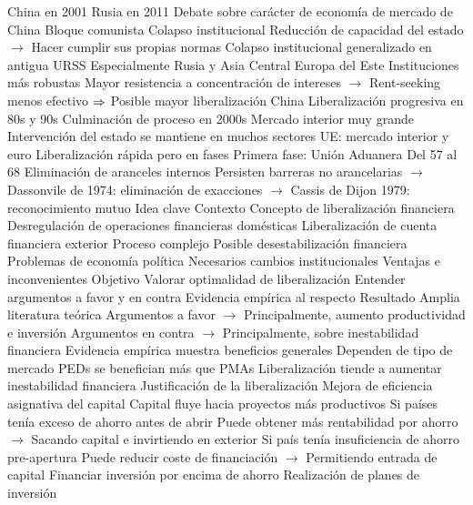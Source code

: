 \documentclass{nuevotema}
\begin{document}
\begin{esquemal}
				\4[] China en 2001
				\4[] Rusia en 2011
				\4[] Debate sobre carácter de economía de mercado de China
			\3 Bloque comunista
				\4 Colapso institucional
				\4[] Reducción de capacidad del estado
				\4[] $\to$ Hacer cumplir sus propias normas
				\4 Colapso institucional generalizado en antigua URSS
				\4[] Especialmente Rusia y Asia Central
				\4 Europa del Este
				\4[] Instituciones más robustas
				\4[] Mayor resistencia a concentración de intereses
				\4[] $\to$ Rent-seeking menos efectivo
				\4[] $\Rightarrow$ Posible mayor liberalización
			\3 China
				\4 Liberalización progresiva en 80s y 90s
				\4 Culminación de proceso en 2000s
				\4 Mercado interior muy grande
				\4 Intervención del estado se mantiene en muchos sectores
			\3 UE: mercado interior y euro
				\4 Liberalización rápida pero en fases
				\4 Primera fase: Unión Aduanera
				\4[] Del 57 al 68
				\4[] Eliminación de aranceles internos
				\4[] Persisten barreras no arancelarias
				\4[] $\to$ Dassonvile de 1974: eliminación de exacciones
				\4[] $\to$ Cassis de Dijon 1979: reconocimiento mutuo
	\1 
		\2 Idea clave
			\3 Contexto
				\4 Concepto de liberalización financiera
				\4[] Desregulación de operaciones financieras domésticas
				\4[] Liberalización de cuenta financiera exterior
				\4 Proceso complejo
				\4[] Posible desestabilización financiera
				\4[] Problemas de economía política
				\4[] Necesarios cambios institucionales
				\4 Ventajas e inconvenientes
			\3 Objetivo
				\4 Valorar optimalidad de liberalización
				\4 Entender argumentos a favor y en contra
				\4 Evidencia empírica al respecto
			\3 Resultado
				\4 Amplia literatura teórica
				\4[] Argumentos a favor
				\4[] $\to$ Principalmente, aumento productividad e inversión
				\4[] Argumentos en contra
				\4[] $\to$ Principalmente, sobre inestabilidad financiera
				\4 Evidencia empírica muestra beneficios generales
				\4 Dependen de tipo de mercado
				\4 PEDs se benefician más que PMAs
				\4 Liberalización tiende a aumentar inestabilidad financiera
		\2 Justificación de la liberalización
			\3 Mejora de eficiencia asignativa del capital
				\4 Capital fluye hacia proyectos más productivos
				\4 Si países tenía exceso de ahorro antes de abrir
				\4[] Puede obtener más rentabilidad por ahorro
				\4[] $\to$ Sacando capital e invirtiendo en exterior
				\4 Si país tenía insuficiencia de ahorro pre-apertura
				\4[] Puede reducir coste de financiación
				\4[] $\to$ Permitiendo entrada de capital
			\3 Financiar inversión por encima de ahorro
				\4 Realización de planes de inversión

\end{esquemal}
\end{document}
